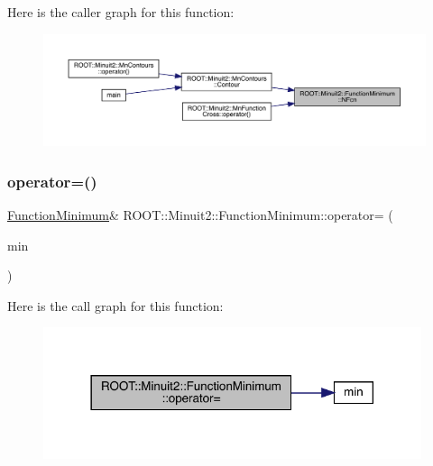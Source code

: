Here is the caller graph for this function\+:\nopagebreak
\begin{figure}[H]
\begin{center}
\leavevmode
\includegraphics[width=350pt]{d4/dfb/classROOT_1_1Minuit2_1_1FunctionMinimum_a8af0f1813c9ae51d7a57a1de0cbae42f_icgraph}
\end{center}
\end{figure}
\mbox{\label{classROOT_1_1Minuit2_1_1FunctionMinimum_a107909f1a994436795eb310f951f14cb}} 
\subsubsection{\texorpdfstring{operator=()}{operator=()}\hspace{0.1cm}{\footnotesize\ttfamily [1/2]}}
{\footnotesize\ttfamily \mbox{\hyperlink{classROOT_1_1Minuit2_1_1FunctionMinimum}{Function\+Minimum}}\& R\+O\+O\+T\+::\+Minuit2\+::\+Function\+Minimum\+::operator= (\begin{DoxyParamCaption}\item[{const \mbox{\hyperlink{classROOT_1_1Minuit2_1_1FunctionMinimum}{Function\+Minimum}} \&}]{min }\end{DoxyParamCaption})\hspace{0.3cm}{\ttfamily [inline]}}

Here is the call graph for this function\+:
\nopagebreak
\begin{figure}[H]
\begin{center}
\leavevmode
\includegraphics[width=314pt]{d4/dfb/classROOT_1_1Minuit2_1_1FunctionMinimum_a107909f1a994436795eb310f951f14cb_cgraph}
\end{center}
\end{figure}
\mbox{\label{classROOT_1_1Minuit2_1_1FunctionMinimum_a107909f1a994436795eb310f951f14cb}} 
